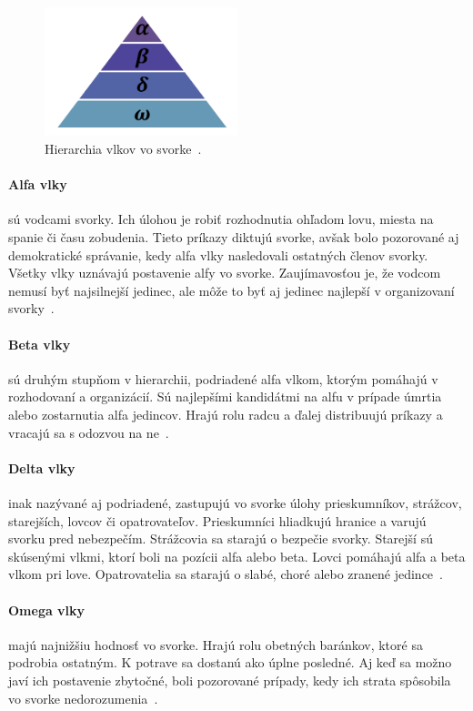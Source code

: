 \documentclass[a4paper,slovak,12pt,appendix]{article}
\begin{document}
\begin{figure}[!ht]
  \centering
  \includegraphics[width=0.5\textwidth]{wolf_hierarchy.png}
  \caption{Hierarchia vlkov vo svorke~\cite{Seeley1991}.}
  \label{fig-wolf-hierarchy}
\end{figure}

\paragraph{Alfa vlky} sú vodcami svorky. Ich úlohou je robiť rozhodnutia
ohľadom lovu, miesta na spanie či času zobudenia. Tieto príkazy diktujú svorke,
avšak bolo pozorované aj demokratické správanie, kedy alfa vlky nasledovali
ostatných členov svorky. Všetky vlky uznávajú postavenie alfy vo svorke.
Zaujímavosťou je, že vodcom nemusí byť najsilnejší jedinec, ale môže to
byť aj jedinec najlepší v organizovaní svorky~\cite{Seeley1991}.

\paragraph{Beta vlky} sú druhým stupňom v hierarchii, podriadené alfa vlkom,
ktorým pomáhajú v rozhodovaní a organizácií. Sú najlepšími kandidátmi na alfu
v prípade úmrtia alebo zostarnutia alfa jedincov. Hrajú rolu radcu a ďalej
distribuujú príkazy a vracajú sa s odozvou na ne~\cite{Seeley1991}.

\paragraph{Delta vlky} inak nazývané aj podriadené, zastupujú vo svorke
úlohy prieskumníkov, strážcov, starejších, lovcov či opatrovateľov.
Prieskumníci hliadkujú hranice a varujú svorku pred nebezpečím. Strážcovia
sa starajú o bezpečie svorky. Starejší sú skúsenými vlkmi, ktorí boli na pozícii
alfa alebo beta. Lovci pomáhajú alfa a beta vlkom pri love. Opatrovatelia sa
starajú o slabé, choré alebo zranené jedince~\cite{Seeley1991}.

\paragraph{Omega vlky} majú najnižšiu hodnosť vo svorke. Hrajú rolu obetných
baránkov, ktoré sa podrobia ostatným. K potrave sa dostanú ako úplne posledné.
Aj keď sa možno javí ich postavenie zbytočné, boli pozorované prípady, kedy ich
strata spôsobila vo svorke nedorozumenia~\cite{Seeley1991}.
\end{document}
